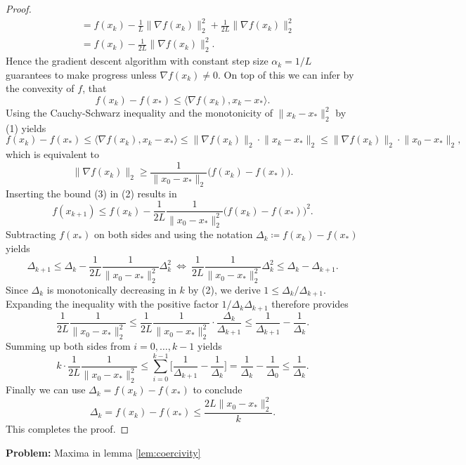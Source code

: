 \documentclass[11pt, a4paper]{article}
\begin{document}
\begin{proof}
\begin{equation}
\begin{split}
&= f(x_k) - \frac{1}{L} \big \| \nabla f(x_k) \big \|_2^2 + \frac{1}{2L} \big \| \nabla f(x_k) \big \|_2^2 \\\
&= f(x_k) - \frac{1}{2L} \big \| \nabla f(x_k) \big \|_2^2.
\end{split} \end{equation}
Hence the gradient descent algorithm with constant step size $\alpha_k = 1/L$ guarantees to make progress unless $\nabla f(x_k) \neq 0$. On top of this we can infer by the convexity of $f$, that
\[ f(x_k) - f(x_*) \leq \big \langle \nabla f(x_k), x_k - x_* \big \rangle. \]
Using the Cauchy-Schwarz inequality and the monotonicity of $\big \| x_{k} - x_* \big \|_2^2$ by (1) yields
\[ f(x_k) - f(x_*) \leq \big \langle \nabla f(x_k), x_k - x_* \big \rangle  \leq \big \| \nabla f(x_k) \big \|_2 \cdot \big \| x_k - x_* \big \|_2 \leq \big \| \nabla f(x_k) \big \|_2 \cdot \big \| x_0 - x_* \big \|_2, \]
which is equivalent to
\begin{equation} \big \| \nabla f(x_k) \big \|_2 \geq \frac{1}{\big \| x_0 - x_* \big \|_2} \big ( f(x_k) - f(x_*) \big ). \end{equation}
Inserting the bound (3) in (2) results in 
\[ f(x_{k+1}) \leq f(x_k) - \frac{1}{2L} \frac{1}{\big \| x_0 - x_* \big \|_2^2} \big ( f(x_k) - f(x_*) \big )^2. \]
Subtracting $f(x_*)$ on both sides and using the notation $\Delta_k \coloneq f(x_k) - f(x_*)$ yields
\[ \Delta_{k+1} \leq \Delta_{k} - \frac{1}{2L} \frac{1}{\big \| x_0 - x_* \big \|_2^2} \Delta_k^2 \ \Leftrightarrow \ \frac{1}{2L} \frac{1}{\big \| x_0 - x_* \big \|_2^2} \Delta_k^2 \leq \Delta_k - \Delta_{k+1}. \]
Since $\Delta_k$ is monotonically decreasing in $k$ by (2), we derive $1 \leq \Delta_k / \Delta_{k+1} $. Expanding the inequality with the positive factor $1/ \Delta_k \Delta_{k+1}$ therefore provides
\[ \frac{1}{2L} \frac{1}{\big \| x_0 - x_* \big \|_2^2} \leq \frac{1}{2L} \frac{1}{\big \| x_0 - x_* \big \|_2^2} \cdot \frac{\Delta_k}{\Delta_{k+1}} \leq  \frac{1}{\Delta_{k+1}} - \frac{1}{\Delta_k}. \]
Summing up both sides from $i=0, \dots, k-1$ yields
\[ k \cdot \frac{1}{2L} \frac{1}{\big \| x_0 - x_* \big \|_2^2} \leq \sum_{i=0}^{k-1} \bigg [ \frac{1}{\Delta_{k+1}} - \frac{1}{\Delta_k} \bigg ] = \frac{1}{\Delta_{k}} - \frac{1}{\Delta_0} \leq \frac{1}{\Delta_{k}}. \]
Finally we can use $\Delta_k = f(x_k) - f(x_*)$ to conclude
\[ \Delta_k = f(x_k) - f(x_*) \leq \frac{2L \big \| x_0 - x_* \big \|_2^2 }{k}. \]
This completes the proof.
\end{proof}

\textbf{Problem:} Maxima in lemma \ref{lem:coercivity}
\end{document}
